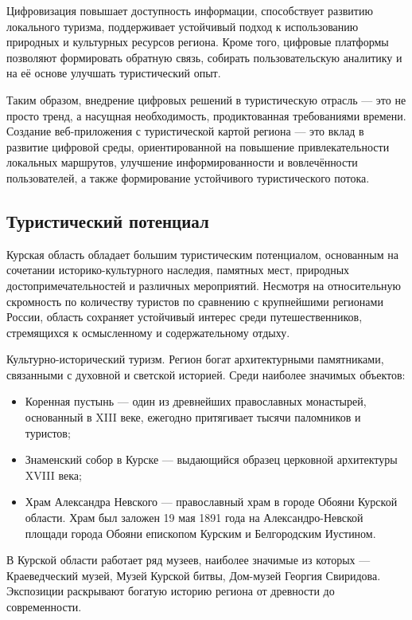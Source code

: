 Цифровизация повышает доступность информации, способствует развитию локального туризма, поддерживает устойчивый подход к использованию природных и культурных ресурсов региона. Кроме того, цифровые платформы позволяют формировать обратную связь, собирать пользовательскую аналитику и на её основе улучшать туристический опыт.

Таким образом, внедрение цифровых решений в туристическую отрасль — это не просто тренд, а насущная необходимость, продиктованная требованиями времени. Создание веб-приложения с туристической картой региона — это вклад в развитие цифровой среды, ориентированной на повышение привлекательности локальных маршрутов, улучшение информированности и вовлечённости пользователей, а также формирование устойчивого туристического потока.

\subsection{Туристический потенциал}

Курская область обладает большим туристическим потенциалом, основанным на сочетании историко-культурного наследия, памятных мест, природных достопримечательностей и различных мероприятий. Несмотря на относительную скромность по количеству туристов по сравнению с крупнейшими регионами России, область сохраняет устойчивый интерес среди путешественников, стремящихся к осмысленному и содержательному отдыху.

Культурно-исторический туризм.
Регион богат архитектурными памятниками, связанными с духовной и светской историей. Среди наиболее значимых объектов:
\begin{itemize}
	\item Коренная пустынь — один из древнейших православных монастырей, основанный в XIII веке, ежегодно притягивает тысячи паломников и туристов;
	\item Знаменский собор в Курске — выдающийся образец церковной архитектуры XVIII века;
	\item Храм Александра Невского — православный храм в городе Обояни Курской области. Храм был заложен 19 мая 1891 года на Александро-Невской площади города Обояни епископом Курским и Белгородским Иустином.
\end{itemize}

В Курской области работает ряд музеев, наиболее значимые из которых — Краеведческий музей, Музей Курской битвы, Дом-музей Георгия Свиридова. Экспозиции раскрывают богатую историю региона от древности до современности.

